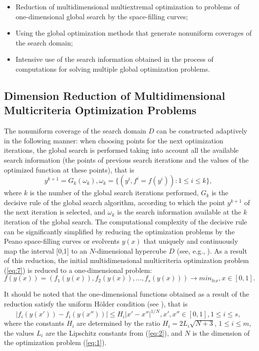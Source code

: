 \documentclass[smallextended]{svjour3}       %
\begin{document}
\begin{itemize}
	\item Reduction of multidimensional multiextremal optimization to problems of one-dimensional global search by the space-filling curves;
	\item Using the global optimization methods that generate nonuniform coverages of the search domain;
	\item Intensive use of the search information obtained in the process of computations for solving multiple global optimization problems.
\end{itemize}

\subsection{Dimension Reduction of Multidimensional Multicriteria Optimization Problems}

The nonuniform coverage of the search domain $D$ can be constructed adaptively in the following manner: when choosing points for the next optimization iterations, the global search is performed taking into account all the available search information (the points of previous search iterations and the values of the optimized function at these points), that is
\begin{equation}\label{eq:11}
y^{k+1}=G_k(\omega_k), \omega_k=\{(y^i,f^i=f(y^i)): 1 \leq i \leq k \},
\end{equation}
where $k$ is the number of the global search iterations performed, $G_k$ is the decisive rule of the global search algorithm, according to which the point $y^{k+1}$ of the next iteration is selected, and $\omega_k$ is the search information available at the $k$ iteration of the global search. The computational complexity of the decisive rule can be significantly simplified by reducing the optimization problems by the Peano space-filling curves or evolvents $y(x)$ that uniquely and continuously map the interval [0,1] to an $N$-dimensional hypercube $D$ (see, e.g., \cite{c17,c18,c23}). As a result of this reduction, the initial multidimensional multicriteria optimization problem (\ref{eq:7}) is reduced to a one-dimensional problem:
\begin{equation}\label{eq:12}
f(y(x)) = (f_1(y(x)), f_2(y(x)), \dots, f_s(y(x))) \to min_{lex},  x \in [0,1].
\end{equation}

It should be noted that the one-dimensional functions obtained as a result of the reduction satisfy the uniform H\"older condition (see \cite{c17,c18}), that is
\begin{equation}\label{eq:13}
|f_i (y(x'))-f_i (y(x''))| \leq H_i |x'-x''|^{1/N}, x',x''\in [0,1], 1 \leq i \leq s,
\end{equation}
where the constants $H_i$ are determined by the ratio $H_i=2L_i\sqrt{N+3}$,  $1 \leq i \leq m$, the values $L_i$ are the Lipschitz constants from (\ref{eq:2}), and $N$ is the dimension of the optimization problem (\ref{eq:1}).
\end{document}
